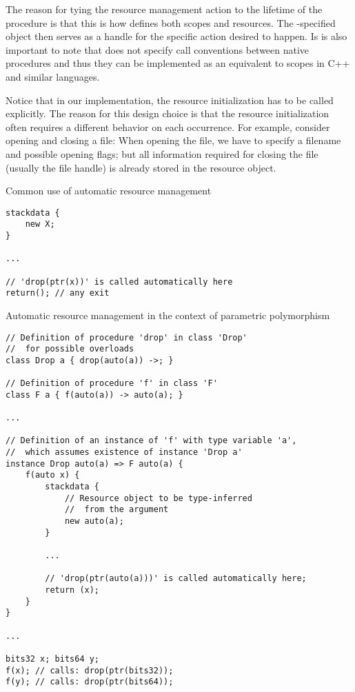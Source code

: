The reason for tying the resource management action to the lifetime of the procedure is that this is how \cmm defines both scopes and resources. The -specified object then serves as a handle for the specific action desired to happen. Is is also important to note that \cmm does not specify call conventions between native \cmm procedures and thus they can be implemented as an equivalent to scopes in C++ and similar languages.

Notice that in our implementation, the resource initialization has to be called explicitly. The reason for this design choice is that the resource initialization often requires a different behavior on each occurrence. For example, consider opening and closing a file: When opening the file, we have to specify a filename and possible opening flags; but all information required for closing the file (usually the file handle) is already stored in the resource object.

\begin{codex}
    \caption{Common use of automatic resource management}
    \label{lst:commonResource}
    \begin{lstlisting}
stackdata {
    new X;
}

...

// 'drop(ptr(x))' is called automatically here
return(); // any exit
    \end{lstlisting}
\end{codex}

\begin{codex}
    \caption{Automatic resource management in the context of parametric polymorphism}
    \label{lst:polyResourceEx}
    \begin{lstlisting}
// Definition of procedure 'drop' in class 'Drop'
//  for possible overloads
class Drop a { drop(auto(a)) ->; }

// Definition of procedure 'f' in class 'F'
class F a { f(auto(a)) -> auto(a); }

...

// Definition of an instance of 'f' with type variable 'a',
//  which assumes existence of instance 'Drop a'
instance Drop auto(a) => F auto(a) {
    f(auto x) {
        stackdata {
            // Resource object to be type-inferred
            //  from the argument
            new auto(a);
        }

        ...

        // 'drop(ptr(auto(a)))' is called automatically here;
        return (x);
    }
}

...

bits32 x; bits64 y;
f(x); // calls: drop(ptr(bits32));
f(y); // calls: drop(ptr(bits64));
    \end{lstlisting}
\end{codex}

